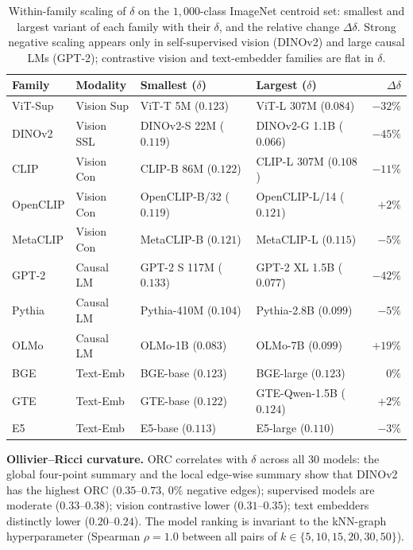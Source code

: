 \documentclass{article}
\begin{document}
\begin{table}[t]
\caption{Within-family scaling of $\delta$ on the $1{,}000$-class ImageNet centroid set: smallest and largest variant of each family with their $\delta$, and the relative change $\Delta\delta$. Strong negative scaling appears only in self-supervised vision (DINOv2) and large causal LMs (GPT-2); contrastive vision and text-embedder families are flat in $\delta$.}
\label{tab:within-family}
\centering\small
\begin{tabular}{l l l l r}
\toprule
Family & Modality & Smallest ($\delta$) & Largest ($\delta$) & $\Delta\delta$ \\
\midrule
ViT-Sup    & Vision Sup & ViT-T 5M ($0.123$)        & ViT-L 307M ($0.084$)         & $-32\%$ \\
DINOv2     & Vision SSL & DINOv2-S 22M ($0.119$)    & DINOv2-G 1.1B ($0.066$)      & $-45\%$ \\
CLIP       & Vision Con & CLIP-B 86M ($0.122$)      & CLIP-L 307M ($0.108$)        & $-11\%$ \\
OpenCLIP   & Vision Con & OpenCLIP-B/32 ($0.119$)   & OpenCLIP-L/14 ($0.121$)      & $+2\%$  \\
MetaCLIP   & Vision Con & MetaCLIP-B ($0.121$)      & MetaCLIP-L ($0.115$)         & $-5\%$  \\
GPT-2      & Causal LM  & GPT-2 S 117M ($0.133$)    & GPT-2 XL 1.5B ($0.077$)      & $-42\%$ \\
Pythia     & Causal LM  & Pythia-410M ($0.104$)     & Pythia-2.8B ($0.099$)        & $-5\%$  \\
OLMo       & Causal LM  & OLMo-1B ($0.083$)         & OLMo-7B ($0.099$)            & $+19\%$ \\
BGE        & Text-Emb   & BGE-base ($0.123$)        & BGE-large ($0.123$)          & $0\%$   \\
GTE        & Text-Emb   & GTE-base ($0.122$)        & GTE-Qwen-1.5B ($0.124$)      & $+2\%$  \\
E5         & Text-Emb   & E5-base ($0.113$)         & E5-large ($0.110$)           & $-3\%$  \\
\bottomrule
\end{tabular}
\end{table}

\textbf{Ollivier--Ricci curvature.} ORC correlates with $\delta$ across all 30 models: the global four-point summary and the local edge-wise summary show that DINOv2 has the highest ORC ($0.35$--$0.73$, $0\%$ negative edges); supervised models are moderate ($0.33$--$0.38$); vision contrastive lower ($0.31$--$0.35$); text embedders distinctly lower ($0.20$--$0.24$). The model ranking is invariant to the kNN-graph hyperparameter (Spearman $\rho = 1.0$ between all pairs of $k \in \{5, 10, 15, 20, 30, 50\}$).
\end{document}

